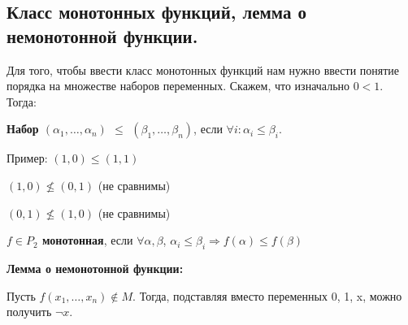 \subsection{Класс монотонных функций, лемма о немонотонной функции.}

   Для того, чтобы ввести класс монотонных функций нам нужно ввести понятие порядка на множестве наборов переменных. Скажем, что изначально $0 < 1$. Тогда:

   \textbf{Набор $(\alpha_1, \ldots, \alpha_n)$ $\le$ $(\beta_1, \ldots, \beta_n)$}, если $\forall i \colon \alpha_i \le \beta_i$.

   Пример: $(1, 0) \le (1, 1)$

   $(1, 0) \nleq (0, 1)$ (не сравнимы)

   $(0, 1) \nleq (1, 0)$ (не сравнимы)

   \textbf{$f \in P_2$ монотонная}, если $\forall \alpha, \beta$, $\alpha_i \le \beta_i \Rightarrow f(\alpha) \le f(\beta)$

    \textbf{Лемма о немонотонной функции:}

   Пусть $f (x_1, \ldots, x_n) \notin M$. Тогда, подставляя вместо переменных 0, 1, x, можно получить $\neg x$.
